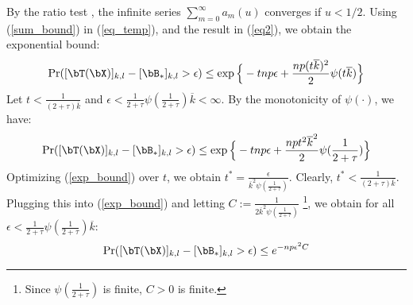 \begin{IEEEproof}
By the ratio test \cite{IntroRealAnalysis}, the infinite series $\sum_{m=0}^\infty a_m(u)$ converges if $u<1/2$. Using (\ref{sum_bound}) in (\ref{eq_temp}), and the result in (\ref{eq2}), we obtain the exponential bound:
\begin{equation*}
	\Pr ([\bT(\bX)]_{k,l}-[\bB_*]_{k,l}>\epsilon) \leq \exp\Big\{-tnp\epsilon + \frac{np(t \overline{k})^2}{2}  \psi(t \overline{k})\Big\}
\end{equation*}
Let $t<\frac{1}{(2+\tau) \overline{k}}$ and $\epsilon<\frac{1}{2+\tau} \psi(\frac{1}{2+\tau}) \overline{k}<\infty$. By the monotonicity of $\psi(\cdot)$, we have:
\begin{equation}
	\Pr([\bT(\bX)]_{k,l}-[\bB_*]_{k,l}>\epsilon) \leq \exp \Big\{-tnp\epsilon + \frac{np t^2 \overline{k}^2}{2}  \psi(\frac{1}{2+\tau}) \Big\} \label{exp_bound}
\end{equation}
Optimizing (\ref{exp_bound}) over $t$, we obtain $t^*=\frac{\epsilon}{\overline{k}^2 \psi(\frac{1}{2+\tau})}$. Clearly, $t^*<\frac{1}{(2+\tau) \overline{k}}$. Plugging this into (\ref{exp_bound}) and letting $C:=\frac{1}{2 \overline{k}^2 \psi(\frac{1}{2+\tau})}$ \footnote{Since $\psi(\frac{1}{2+\tau})$ is finite, $C>0$ is finite.}, we obtain for all $\epsilon < \frac{1}{2+\tau} \psi(\frac{1}{2+\tau}) \overline{k}$:
\begin{equation} \label{upper_tail_2}
	\Pr([\bT(\bX)]_{k,l}-[\bB_*]_{k,l}>\epsilon) \leq e^{-np\epsilon^2 C}
\end{equation}


\end{IEEEproof}
